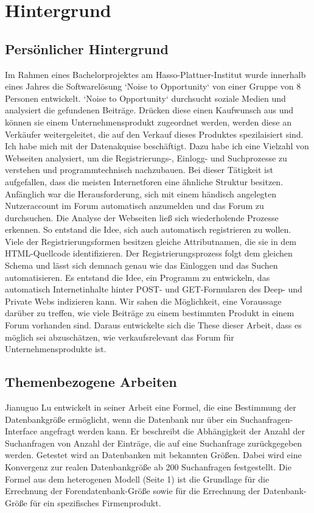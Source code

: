\section{Hintergrund}

\subsection{Persönlicher Hintergrund}
Im Rahmen eines Bachelorprojektes am Hasso-Plattner-Institut wurde innerhalb eines Jahres die Softwarelösung `Noise to Opportunity` von einer Gruppe von 8 Personen entwickelt. `Noise to Opportunity` durchsucht soziale Medien und analysiert die gefundenen Beiträge. Drücken diese einen Kaufwunsch aus und können sie einem Unternehmensprodukt zugeordnet werden, werden diese an Verkäufer weitergeleitet, die auf den Verkauf dieses Produktes spezilaisiert sind. Ich habe mich mit der Datenakquise beschäftigt. Dazu habe ich eine Vielzahl von Webseiten analysiert, um die Registrierungs-, Einlogg- und Suchprozesse zu verstehen und programmtechnisch nachzubauen. Bei dieser Tätigkeit ist aufgefallen, dass die meisten Internetforen eine ähnliche Struktur besitzen. Anfänglich war die Herausforderung, sich mit einem händisch angelegten Nutzeraccount im Forum automatisch anzumelden und das Forum zu durchsuchen. Die Analyse der Webseiten ließ sich wiederholende Prozesse erkennen. So entstand die Idee, sich auch automatisch registrieren zu wollen.
Viele der Registrierungsformen besitzen gleiche Attributnamen, die sie in dem HTML-Quellcode identifizieren. Der Registrierungsprozess folgt dem gleichen Schema und lässt sich demnach genau wie das Einloggen und das Suchen automatisieren. Es entstand die Idee, ein Programm zu entwickeln, das automatisch Internetinhalte hinter POST- und GET-Formularen des Deep- und Private Webs indizieren kann. Wir sahen die Möglichkeit, eine Voraussage darüber zu treffen, wie viele Beiträge zu einem bestimmten Produkt in einem Forum vorhanden sind.
Daraus entwickelte sich die These dieser Arbeit, dass es möglich sei abzuschätzen, wie verkaufsrelevant das Forum für Unternehmensprodukte ist.

\subsection{Themenbezogene Arbeiten}

Jianuguo Lu \cite{lu2008efficient} entwickelt in seiner Arbeit eine Formel, die eine Bestimmung der Datenbankgröße ermöglicht, wenn die Datenbank nur über ein Suchanfragen-Interface angefragt werden kann. Er beschreibt die Abhängigkeit der Anzahl der Suchanfragen von Anzahl der Einträge, die auf eine Suchanfrage zurückgegeben werden. Getestet wird an Datenbanken mit bekannten Größen. Dabei wird eine Konvergenz zur realen Datenbankgröße ab 200 Suchanfragen festgestellt. Die Formel aus dem heterogenen Modell (Seite 1) ist die Grundlage für die Errechnung der Forendatenbank-Größe sowie für die Errechnung der Datenbank-Größe für ein spezifisches Firmenprodukt.

